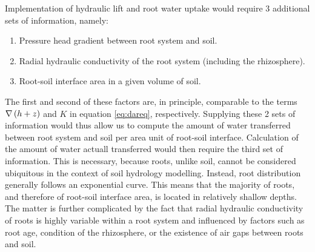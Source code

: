 Implementation of hydraulic lift and root water uptake would require 3 additional sets of information, namely:
\begin{enumerate}
\item Pressure head gradient between root system and soil.
\item Radial hydraulic conductivity of the root system (including the rhizosphere).
\item Root-soil interface area in a given volume of soil.
\end{enumerate}
The first and second of these factors are, in principle, comparable to the terms $\nabla \del{ h + z }$ and $K$ in equation \eqref{eq:dareq}, respectively. Supplying these 2 sets of information would thus allow us to compute the amount of water transferred between root system and soil per area unit of root-soil interface.  Calculation of the amount of water actuall transferred would then require the third set of information.  This is necessary, because roots, unlike soil, cannot be considered ubiquitous in the context of soil hydrology modelling.  Instead, root distribution generally follows an exponential curve.  This means that the majority of roots, and therefore of root-soil interface area, is located in relatively shallow depths.  The matter is further complicated by the fact that radial hydraulic conductivity of roots is highly variable within a root system and influenced by factors such as root age, condition of the rhizosphere, or the existence of air gaps between roots and soil.

